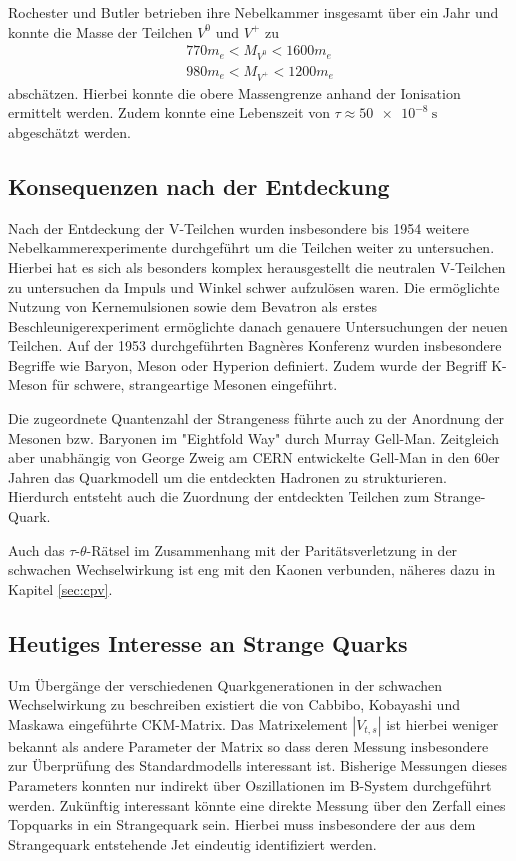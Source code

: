 Rochester und Butler betrieben ihre Nebelkammer insgesamt über ein Jahr und konnte die Masse der Teilchen $V^0$ und $V^+$ zu
\begin{align*}
	770 m_e < M_{V^0} < 1600 m_e \\
	980 m_e < M_{V^+} < 1200 m_e
\end{align*}
abschätzen.
Hierbei konnte die obere Massengrenze anhand der Ionisation ermittelt werden.
Zudem konnte eine Lebenszeit von $\tau \approx \SI{50e-8}{\second}$ abgeschätzt werden.

\subsection{Konsequenzen nach der Entdeckung}
 
 Nach der Entdeckung der V-Teilchen wurden insbesondere bis 1954 weitere Nebelkammerexperimente durchgeführt um die Teilchen weiter zu untersuchen.
 Hierbei hat es sich als besonders komplex herausgestellt die neutralen V-Teilchen zu untersuchen da Impuls und Winkel schwer aufzulösen waren.
 Die ermöglichte Nutzung von Kernemulsionen sowie dem Bevatron als erstes Beschleunigerexperiment ermöglichte danach genauere Untersuchungen der neuen Teilchen.
 Auf der 1953 durchgeführten Bagnères Konferenz wurden insbesondere Begriffe wie Baryon, Meson oder Hyperion definiert.
 Zudem wurde der Begriff K-Meson für schwere, strangeartige Mesonen eingeführt.

 Die zugeordnete Quantenzahl der Strangeness führte auch zu der Anordnung der Mesonen bzw. Baryonen im "Eightfold Way" durch Murray Gell-Man.
 Zeitgleich aber unabhängig von George Zweig am CERN entwickelte Gell-Man in den 60er Jahren das Quarkmodell um die entdeckten Hadronen zu strukturieren.
 Hierdurch entsteht auch die Zuordnung der entdeckten Teilchen zum Strange-Quark.

 Auch das $\tau$-$\theta$-Rätsel im Zusammenhang mit der Paritätsverletzung in der schwachen Wechselwirkung ist eng mit den Kaonen verbunden, näheres dazu in Kapitel \ref{sec:cpv}.

\subsection{Heutiges Interesse an Strange Quarks}
Um Übergänge der verschiedenen Quarkgenerationen in der schwachen Wechselwirkung zu beschreiben existiert die von Cabbibo, Kobayashi und Maskawa eingeführte CKM-Matrix.
Das Matrixelement $|V_{t,s}|$ ist hierbei weniger bekannt als andere Parameter der Matrix so dass deren Messung insbesondere zur Überprüfung des Standardmodells interessant ist.
Bisherige Messungen dieses Parameters konnten nur indirekt über Oszillationen im B-System durchgeführt werden.
Zukünftig interessant könnte eine direkte Messung über den Zerfall eines Topquarks in ein Strangequark sein.
Hierbei muss insbesondere der aus dem Strangequark entstehende Jet eindeutig identifiziert werden.
